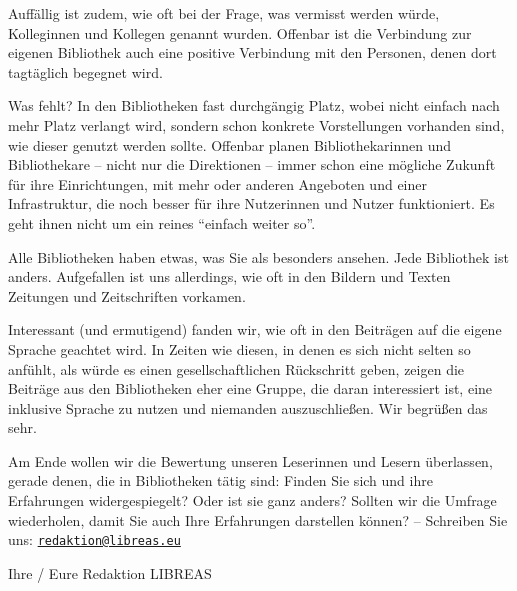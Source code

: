 Auffällig ist zudem, wie oft bei der Frage, was vermisst werden würde,
Kolleginnen und Kollegen genannt wurden. Offenbar ist die Verbindung zur
eigenen Bibliothek auch eine positive Verbindung mit den Personen, denen
dort tagtäglich begegnet wird.

Was fehlt? In den Bibliotheken fast durchgängig Platz, wobei nicht
einfach nach mehr Platz verlangt wird, sondern schon konkrete
Vorstellungen vorhanden sind, wie dieser genutzt werden sollte. Offenbar
planen Bibliothekarinnen und Bibliothekare -- nicht nur die Direktionen
-- immer schon eine mögliche Zukunft für ihre Einrichtungen, mit mehr
oder anderen Angeboten und einer Infrastruktur, die noch besser für ihre
Nutzerinnen und Nutzer funktioniert. Es geht ihnen nicht um ein reines
\enquote{einfach weiter so}.

Alle Bibliotheken haben etwas, was Sie als besonders ansehen. Jede
Bibliothek ist anders. Aufgefallen ist uns allerdings, wie oft in den
Bildern und Texten Zeitungen und Zeitschriften vorkamen.

Interessant (und ermutigend) fanden wir, wie oft in den Beiträgen auf
die eigene Sprache geachtet wird. In Zeiten wie diesen, in denen es sich
nicht selten so anfühlt, als würde es einen gesellschaftlichen
Rückschritt geben, zeigen die Beiträge aus den Bibliotheken eher eine
Gruppe, die daran interessiert ist, eine inklusive Sprache zu nutzen und
niemanden auszuschließen. Wir begrüßen das sehr.

Am Ende wollen wir die Bewertung unseren Leserinnen und Lesern
überlassen, gerade denen, die in Bibliotheken tätig sind: Finden Sie
sich und ihre Erfahrungen widergespiegelt? Oder ist sie ganz anders?
Sollten wir die Umfrage wiederholen, damit Sie auch Ihre Erfahrungen
darstellen können? -- Schreiben Sie uns:
\href{mailto:redaktion@libreas.eu}{\nolinkurl{redaktion@libreas.eu}}

Ihre / Eure Redaktion LIBREAS